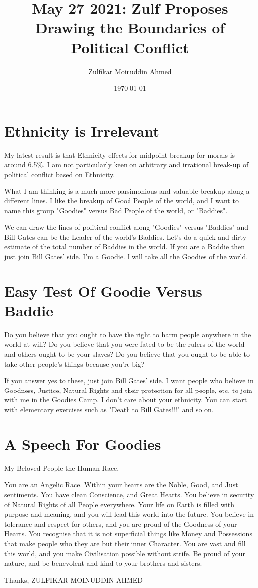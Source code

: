 \documentclass{amsart}
\title{May 27 2021:  Zulf Proposes Drawing the Boundaries of Political Conflict}
\author{Zulfikar Moinuddin Ahmed}
\date{\today}
\begin{document}
\maketitle

\section{Ethnicity is Irrelevant}

My latest result is that Ethnicity effects for midpoint breakup for morals is around 6.5\%.  I am not particularly keen on arbitrary and irrational break-up of political conflict based on Ethnicity.

What I am thinking is a much more parsimonious and valuable breakup along a different lines.  I like the breakup of Good People of the world, and I want to name this group "Goodies" versus Bad People of the world, or "Baddies".

We can draw the lines of political conflict along "Goodies" versus "Baddies" and Bill Gates can be the Leader of the world's Baddies.  Let's do a quick and dirty estimate of the total number of Baddies in the world.  If you are a Baddie then just join Bill Gates' side.  I'm a Goodie.  I will take all the Goodies of the world.  

\section{Easy Test Of Goodie Versus Baddie}

Do you believe that you ought to have the right to harm people anywhere in the world at will?  Do you believe that you were fated to be the rulers of the world and others ought to be your slaves?  Do you believe that you ought to be able to take other people's things because you're big?

If you answer yes to these, just join Bill Gates' side.  I want people who believe in Goodness, Justice, Natural Rights and their protection for all people, etc. to join with me in the Goodies Camp.  I don't care about your ethnicity.  You can start with elementary exercises such as "Death to Bill Gates!!!" and so on.

\section{A Speech For Goodies}

My Beloved People the Human Race,

You are an Angelic Race.  Within your hearts are the Noble, Good, and Just sentiments.  You have clean Conscience, and Great Hearts.  You believe in security of Natural Rights of all People everywhere.  Your life on Earth is filled with purpose and meaning, and you will lead this world into the future.  You believe in tolerance and respect for others, and you are proud of the Goodness of your Hearts.  You recognise that it is not superficial things like Money and Possessions that make people who they are but their inner Character.  You are vast and fill this world, and you make Civilisation possible without strife.  Be proud of your nature, and be benevolent and kind to your brothers and sisters.

Thanks,
ZULFIKAR MOINUDDIN AHMED
\end{document}
